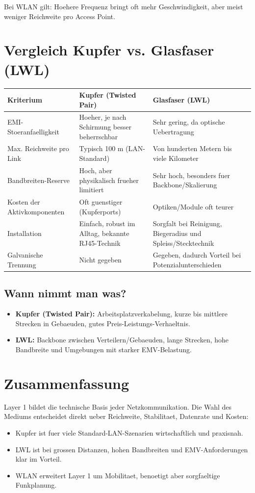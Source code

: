 \documentclass[11pt, oneside, numbers=noenddot]{scrbook}
\begin{document}
Bei WLAN gilt: Hoehere Frequenz bringt oft mehr Geschwindigkeit, aber meist weniger Reichweite pro Access Point.

\section{Vergleich Kupfer vs. Glasfaser (LWL)}
\begin{longtable}{|p{3.2cm}|p{5.3cm}|p{5.3cm}|}
\hline
\textbf{Kriterium} & \textbf{Kupfer (Twisted Pair)} & \textbf{Glasfaser (LWL)} \\
\hline
EMI-Stoeranfaelligkeit & Hoeher, je nach Schirmung besser beherrschbar & Sehr gering, da optische Uebertragung \\
\hline
Max. Reichweite pro Link & Typisch 100 m (LAN-Standard) & Von hunderten Metern bis viele Kilometer \\
\hline
Bandbreiten-Reserve & Hoch, aber physikalisch frueher limitiert & Sehr hoch, besonders fuer Backbone/Skalierung \\
\hline
Kosten der Aktivkomponenten & Oft guenstiger (Kupferports) & Optiken/Module oft teurer \\
\hline
Installation & Einfach, robust im Alltag, bekannte RJ45-Technik & Sorgfalt bei Reinigung, Biegeradius und Spleiss/Stecktechnik \\
\hline
Galvanische Trennung & Nicht gegeben & Gegeben, dadurch Vorteil bei Potenzialunterschieden \\
\hline
\end{longtable}

\subsection*{Wann nimmt man was?}
\begin{itemize}
\item \textbf{Kupfer (Twisted Pair):} Arbeitsplatzverkabelung, kurze bis mittlere Strecken in Gebaeuden, gutes Preis-Leistungs-Verhaeltnis.
\item \textbf{LWL:} Backbone zwischen Verteilern/Gebaeuden, lange Strecken, hohe Bandbreite und Umgebungen mit starker EMV-Belastung.
\end{itemize}

\section{Zusammenfassung}
Layer 1 bildet die technische Basis jeder Netzkommunikation. Die Wahl des Mediums entscheidet direkt ueber Reichweite, Stabilitaet, Datenrate und Kosten:
\begin{itemize}
\item Kupfer ist fuer viele Standard-LAN-Szenarien wirtschaftlich und praxisnah.
\item LWL ist bei grossen Distanzen, hohen Bandbreiten und EMV-Anforderungen klar im Vorteil.
\item WLAN erweitert Layer 1 um Mobilitaet, benoetigt aber sorgfaeltige Funkplanung.
\end{itemize}
\end{document}
